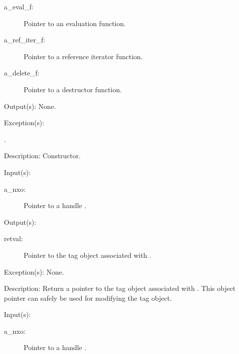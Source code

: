 \begin{capi}
\begin{capilist}
\begin{description}
		\item[a\_eval\_f: ]
			Pointer to an evaluation function.
		\item[a\_ref\_iter\_f: ]
			Pointer to a reference iterator function.
		\item[a\_delete\_f: ]
			Pointer to a destructor function.
		\end{description}
	\item[Output(s): ] None.
	\item[Exception(s): ]
		\begin{description}\item[]
		\item[.]
		\end{description}
	\item[Description: ]
		Constructor.
	\end{capilist}
\label{nxo_handle_tag_get}
	\begin{capilist}
	\item[Input(s): ]
		\begin{description}\item[]
		\item[a\_nxo: ]
			Pointer to a handle .
		\end{description}
	\item[Output(s): ]
		\begin{description}\item[]
		\item[retval: ]
			Pointer to the tag object associated with .
		\end{description}
	\item[Exception(s): ] None.
	\item[Description: ]
		Return a pointer to the tag object associated with
		.  This object pointer can safely be used for
		modifying the tag object.
	\end{capilist}
\label{nxo_handle_opaque_get}
	\begin{capilist}
	\item[Input(s): ]
		\begin{description}\item[]
		\item[a\_nxo: ]
			Pointer to a handle \classname{nxo}.

\end{description}
\end{capilist}
\end{capi}

